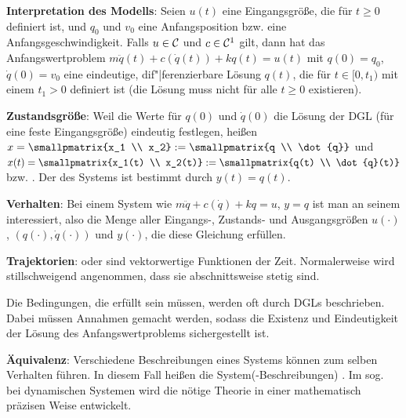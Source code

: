 \linie
\pagebreak

\textbf{Interpretation des Modells}:
Seien $u(t)$ eine Eingangsgröße, die für $t \ge 0$ definiert ist, und
$q_0$ und $v_0$ eine Anfangsposition bzw. eine Anfangsgeschwindigkeit.
Falls $u \in \mathcal{C}$ und $c \in \mathcal{C}^1$ gilt,
dann hat das Anfangswertproblem $m \ddot{q}(t) + c(\dot{q}(t)) + k q(t) = u(t)$ mit $q(0) = q_0$,
$\dot{q}(0) = v_0$ eine eindeutige, dif"|ferenzierbare Lösung $q(t)$, die für $t \in [0, t_1)$
mit einem $t_1 > 0$ definiert ist
(die Lösung muss nicht für alle $t \ge 0$ existieren).

\textbf{Zustandsgröße}:
Weil die Werte für $q(0)$ und $\dot{q}(0)$ die Lösung der DGL (für eine feste Eingangsgröße)
eindeutig festlegen,
heißen $x = \smallpmatrix{x_1 \\ x_2} := \smallpmatrix{q \\ \dot{q}}$ und
$x(t) = \smallpmatrix{x_1(t) \\ x_2(t)} := \smallpmatrix{q(t) \\ \dot{q}(t)}$
 bzw. .
Der  des Systems ist bestimmt durch $y(t) = q(t)$.

\textbf{Verhalten}:
Bei einem System wie $m \ddot{q} + c(\dot{q}) + kq = u$, $y = q$
ist man an seinem  interessiert,
also die Menge aller Eingangs-, Zustands- und Ausgangsgrößen $u(\cdot)$,
$(q(\cdot), \dot{q}(\cdot))$ und $y(\cdot)$, die diese Gleichung erfüllen.

\textbf{Trajektorien}:
 oder 
sind vektorwertige Funktionen der Zeit.
Normalerweise wird stillschweigend angenommen, dass sie abschnittsweise stetig sind.

Die Bedingungen, die erfüllt sein müssen, werden oft durch DGLs beschrieben.
Dabei müssen Annahmen gemacht werden, sodass die Existenz und Eindeutigkeit der Lösung des
Anfangswertproblems sichergestellt ist.

\textbf{Äquivalenz}:
Verschiedene Beschreibungen eines Systems können zum selben Verhalten führen.
In diesem Fall heißen die System(-Beschreibungen) .
Im sog.  bei dynamischen Systemen wird die nötige Theorie in
einer mathematisch präzisen Weise entwickelt.

\linie

